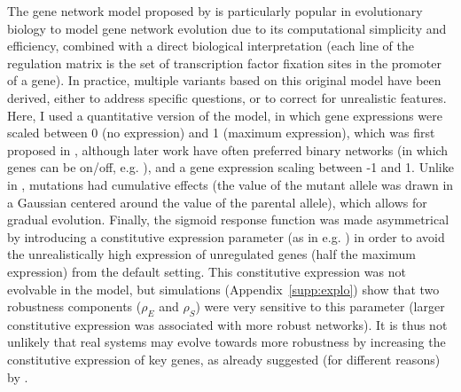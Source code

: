 \documentclass[10pt,a4paper]{article}
\newcommand{\stability}{{\rho_S}}
\newcommand{\earlyenv}{{\rho_E}}
\newcommand{\SupMat}{Appendix~}
\begin{document}
The gene network model proposed by \citet{Wag94} is particularly popular in evolutionary biology to model gene network evolution due to its computational simplicity and efficiency, combined with a direct biological interpretation (each line of the regulation matrix is the set of transcription factor fixation sites in the promoter of a gene). In practice, multiple variants based on this original model have been derived, either to address specific questions, or to correct for unrealistic features. Here, I used a quantitative version of the model, in which gene expressions were scaled between 0 (no expression) and 1 (maximum expression), which was first proposed in \citet{Wag94}, although later work have often preferred binary networks (in which genes can be on/off, e.g. \citealp{Wag96,CMW07}), and a gene expression scaling between -1 and 1. Unlike in \citet{Wag96, SB02}, mutations had cumulative effects (the value of the mutant allele was drawn in a Gaussian centered around the value of the parental allele), which allows for gradual evolution. Finally, the sigmoid response function was made asymmetrical by introducing a constitutive expression parameter (as in e.g. \citealp{RL16}) in order to avoid the unrealistically high expression of unregulated genes (half the maximum expression) from the default setting. This constitutive expression was not evolvable in the model, but simulations (\SupMat \ref{supp:explo}) show that two robustness components ($\earlyenv$ and $\stability$) were very sensitive to this parameter (larger constitutive expression was associated with more robust networks). It is thus not unlikely that real systems may evolve towards more robustness by increasing the constitutive expression of key genes, as already suggested (for different reasons) by \citet{DW15}. 
\end{document}
